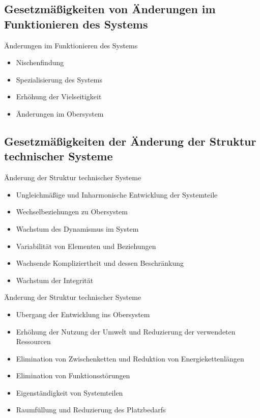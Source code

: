 \documentclass{beamer}
\begin{document}
\subsection{Gesetzmäßigkeiten von Änderungen im Funktionieren des Systems}
\begin{frame}{Änderungen im Funktionieren des Systems}
\begin{itemize}
\item Nischenfindung
\item Spezialisierung des Systems
\item Erhöhung der Vielseitigkeit
\item Änderungen im Obersystem
\end{itemize}
\end{frame}

\subsection{Gesetzmäßigkeiten der Änderung der Struktur technischer Systeme}
\begin{frame}{Änderung der Struktur technischer Systeme}
\begin{itemize}
\item Ungleichmäßige und Inharmonische Entwicklung der Systemteile
\item Wechselbeziehungen zu Obersystem
\item Wachstum des Dynamismus im System
\item Variabilität von Elementen und Beziehungen
\item Wachsende Kompliziertheit und dessen Beschränkung
\item Wachstum der Integrität
\end{itemize}
\end{frame}
\begin{frame}{Änderung der Struktur technischer Systeme}
\begin{itemize}
\item Ubergang der Entwicklung ins Obersystem
\item Erhöhung der Nutzung der Umwelt und Reduzierung der verwendeten Ressourcen
\item Elimination von Zwischenketten und Reduktion von Energiekettenlängen
\item Elimination von Funktionsstörungen
\item Eigenständigkeit von Systemteilen
\item Raumfüllung und Reduzierung des Platzbedarfs
\end{itemize}
\end{frame}
\end{document}
